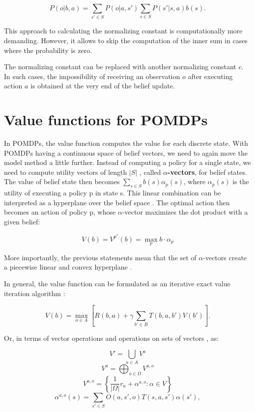 \begin{equation} P(o|b, a) = \sum_{s' \in S} P(o|a, s')\sum_{s \in S} P(s'|s, a)b(s).\end{equation}

This approach to calculating the normalizing constant is computationally more demanding. However, it allows to skip the computation of the inner sum in cases where the probability is zero.

The normalizing constant can be replaced with another normalizing constant $c$. In such cases, the impossibility of receiving an observation $o$ after executing action $a$ is obtained at the very end of the belief update.


\section{Value functions for POMDPs}
In POMDPs, the value function computes the value for each discrete state. With POMDPs having a continuous space of belief vectors, we need to again move the model method a little further. Instead of computing a policy for a single state, we need to compute utility vectors of length $|S|$ , called \textbf{$\alpha$-vectors}, for belief states. The value of belief state then becomes $\sum_{s \in S} b(s) \alpha_p(s)$, where $\alpha_p(s)$ is the utility of executing a policy p in state s. This linear combination can be interpreted as a hyperplane over the belief space \cite{pbvi}. The optimal action then becomes an action of policy p, whose $\alpha$-vector maximizes the dot product with a given belief:

\begin{equation} V(b) = V^{p}^{*}(b) = \operatorname*{max}_p b \cdot \alpha_p \end{equation}

More importantly, the previous statements mean that the set of $\alpha$-vectors create a piecewise linear and convex hyperplane \cite{russel2010}.

In general, the value function can be formulated as an iterative exact value iteration algorithm \cite{Shani2013}:

\begin{equation} V(b) = \max_{a \in A} [R(b, a) + \gamma \sum_{b' \in B} T(b, a, b') V(b')].\end{equation}

Or, in terms of vector operations and operations on sets of vectors \cite{Shani2013}, as:

\begin{equation} \label{eq:1} V' = \bigcup_{a \in A} V^a \end{equation}
\begin{equation} \label{eq:2} V^a = \bigoplus_{o \in \Omega} V^{a,o} \end{equation}
\begin{equation} \label{eq:3} V^{a,o} = \left\{\dfrac{1}{|\Omega|} r_a + \alpha^{a, o} : \alpha \in V \right\} \end{equation} 
\begin{equation} \label{eq:4} \alpha^{a, o}(s) = \sum_{s' \in S} O(a, s', o) T(s, a, s') \alpha(s'),\end{equation}

